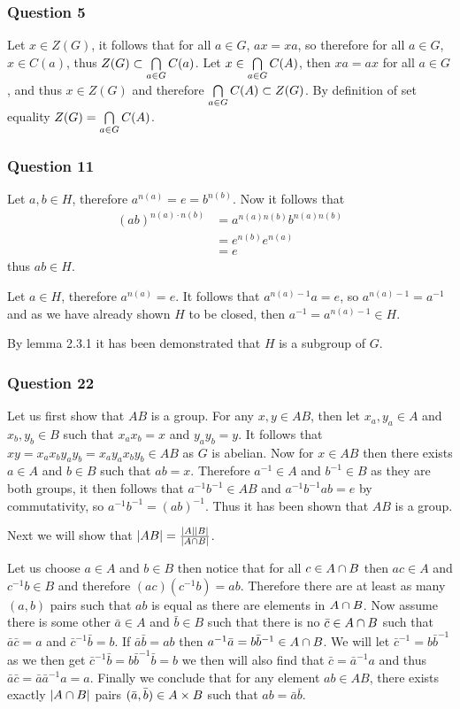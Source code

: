 \documentclass{article}
\begin{document}
\subsubsection{Question 5}
Let $x \in Z(G)$, it follows that for all $a \in G$, $ax = xa$, so therefore for all $a \in G$, $x \in C(a)$, thus $Z(G) \subset \bigcap\limits_{a\in G}^{}  {C(a)} $. Let $x \in \bigcap\limits_{a\in G}^{}  {C(A)} $, then $xa = ax$ for all $a \in G$, and thus $x \in Z(G)$ and therefore $\bigcap\limits_{a\in G}^{}  {C(A)}  \subset Z(G)$. By definition of set equality $Z(G) = \bigcap\limits_{a\in G}^{}  {C(A)} $.

\subsubsection{Question 11}
Let $a,b \in H$, therefore $a^{n(a)} = e = b^{n(b)}$. Now it follows that
\begin{align*}
(ab)^{n(a)\cdot n(b)} &= a^{n(a)n(b)}b^{n(a)n(b)} \\
&= e^{n(b)}e^{n(a)} \\
&= e
\end{align*}
thus $ab \in H$.

Let $a \in H$, therefore $a^{n(a)} = e$. It follows that $a^{n(a)-1}a = e$, so $a^{n(a)-1} = a^{-1}$ and as we have already shown $H$ to be closed, then $a^{-1}=a^{n(a)-1}\in H$.

By lemma 2.3.1 it has been demonstrated that $H$ is a subgroup of $G$.

\subsubsection{Question 22}

Let us first show that $AB$ is a group. For any $x,y\in AB$, then let $x_a,y_a \in A$ and $x_b,y_b\in B$ such that $x_ax_b = x$ and $y_ay_b = y$. It follows that $xy = x_ax_by_ay_b = x_ay_ax_by_b \in AB$ as $G$ is abelian. Now for $x \in AB$ then there exists $a\in A$ and $b\in B$ such that $ab = x$. Therefore $a^{-1} \in A$ and $b^{-1}\in B$ as they are both groups, it then follows that $a^{-1}b^{-1} \in AB$ and $a^{-1}b^{-1}ab = e$ by commutativity, so $a^{-1}b^{-1}=(ab)^{-1}$. Thus it has been shown that $AB$ is a group.

Next we will show that $\left| {AB} \right|= \frac{\left| {A} \right|\left| {B} \right|}{\left| {A\cap B} \right|}$. 

Let us choose $a \in A$ and $b \in B$ then notice that for all $c \in A\cap B$ then $ac \in A$ and $c^{-1}b \in B$ and therefore $(ac)(c^{-1}b) = ab$. Therefore there are at least as many $(a,b)$ pairs such that $ab$ is equal as there are elements in $A \cap B$. Now assume there is some other $\bar a \in A$ and $\bar b \in B$ such that there is no $\bar c \in A\cap B$ such that $\bar a \bar c = a$ and ${\bar c}^{-1}\bar b = b$. If $\bar a\bar b = ab$ then $a^{-1}\bar a = b\bar b^{-1} \in A\cap B$. We will let $\bar c^{-1} = b\bar b^{-1}$ as we then get $\bar c^{-1}\bar b = b\bar b^{-1}\bar b = b$ we then will also find that $\bar c= \bar a^{-1}a$ and thus $\bar a\bar c = \bar a\bar a^{-1}a = a$. Finally we conclude that for any element $ab \in AB$, there exists exactly $\left| {A \cap B} \right|$ pairs $(\bar a,\bar b) \in A\times B$ such that $ab = \bar a\bar b$.
\end{document}
